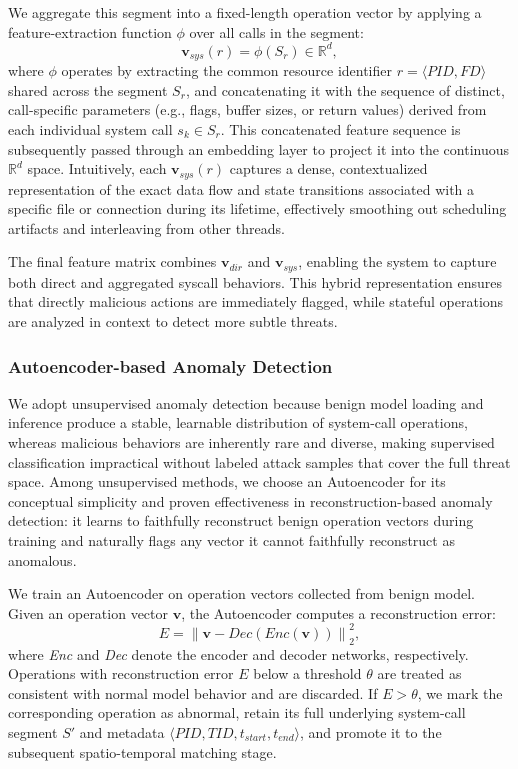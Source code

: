 We aggregate this segment into a fixed-length operation vector by applying a feature-extraction function $\phi$ over all calls in the segment:
\begin{equation}
\mathbf{v}_{\textit{sys}}(r) = \phi(S_r) \in \mathbb{R}^{d},
\end{equation}
where $\phi$ operates by extracting the common resource identifier $r = \langle \textit{PID}, \textit{FD} \rangle$ shared across the segment $S_r$, and concatenating it with the sequence of distinct, call-specific parameters (e.g., flags, buffer sizes, or return values) derived from each individual system call $s_k \in S_r$. This concatenated feature sequence is subsequently passed through an embedding layer to project it into the continuous $\mathbb{R}^{d}$ space. Intuitively, each $\mathbf{v}_{\textit{sys}}(r)$ captures a dense, contextualized representation of the exact data flow and state transitions associated with a specific file or connection during its lifetime, effectively smoothing out scheduling artifacts and interleaving from other threads.

The final feature matrix combines $\mathbf{v}_{\textit{dir}}$ and $\mathbf{v}_{\textit{sys}}$, enabling the system to capture both direct and aggregated syscall behaviors. This hybrid representation ensures that directly malicious actions are immediately flagged, while stateful operations are analyzed in context to detect more subtle threats.

\subsubsection{Autoencoder-based Anomaly Detection}

We adopt unsupervised anomaly detection because benign model loading and inference produce a stable, learnable distribution of system-call operations, whereas malicious behaviors are inherently rare and diverse, making supervised classification impractical without labeled attack samples that cover the full threat space. Among unsupervised methods, we choose an Autoencoder for its conceptual simplicity and proven effectiveness in reconstruction-based anomaly detection: it learns to faithfully reconstruct benign operation vectors during training and naturally flags any vector it cannot faithfully reconstruct as anomalous.

We train an Autoencoder on operation vectors collected from benign model. Given an operation vector $\mathbf{v}$, the Autoencoder computes a reconstruction error:
\begin{equation}
E = \left\lVert \mathbf{v} - \textit{Dec}(\textit{Enc}(\mathbf{v})) \right\rVert_2^2,
\end{equation}
where \textit{Enc} and \textit{Dec} denote the encoder and decoder networks, respectively. Operations with reconstruction error $E$ below a threshold $\theta$ are treated as consistent with normal model behavior and are discarded. If $E > \theta$, we mark the corresponding operation as abnormal, retain its full underlying system-call segment $S'$ and metadata $\langle \textit{PID}, \textit{TID}, t_{\textit{start}}, t_{\textit{end}} \rangle$, and promote it to the subsequent spatio-temporal matching stage.

